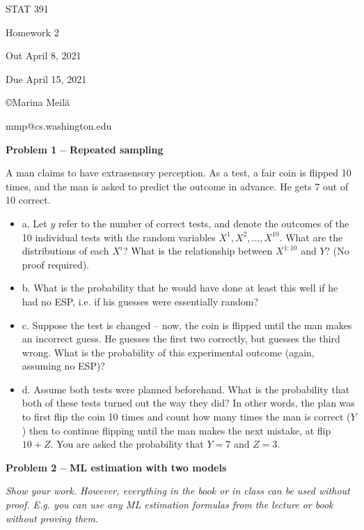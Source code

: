 \documentclass[10pt]{article}
\newcommand{\bit}{\begin{itemize}}
\newcommand{\eit}{\end{itemize}}
\begin{document}
\begin{Large}
\centerline{STAT 391} 
\centerline{Homework 2}  %
\centerline{Out April 8, 2021}      %
\centerline{Due April 15, 2021}      %
\end{Large}

\centerline{\large \copyright Marina Meil\u{a}}
\centerline{\large mmp@cs.washington.edu}

\vspace{2em}
{\bf Problem 1 -- Repeated sampling}
       
A man claims to have extrasensory perception. As a test, a fair coin
is flipped 10 times, and the man is asked to predict the outcome in
advance. He gets 7 out of 10 correct. 

\bit
\item[a.]  Let $y$ refer to the number of correct tests, and
   denote the outcomes of the 10 individual tests with the random
   variables $X^1,X^2,..., X^{10}$.  What are the distributions
   of each $X^i$?  What is the relationship
   between $X^{1:10}$ and $Y$?   (No proof required).

\item[b.] What is the probability that he would have done at least
   this well if he had no ESP, i.e. if his guesses were essentially
   random?  

\item[c.] Suppose the test is changed -- now, the coin is flipped until the
   man makes an incorrect guess.  He guesses the first two correctly,
   but guesses the third wrong.  What is the probability of this
   experimental outcome (again, assuming no ESP)?

\item[d.] Assume both tests were planned beforehand.  What is the
  probability that both of these tests turned out the way they did?
  In other words, the plan was to first flip the coin 10 times and
  count how many times the man is correct ($Y$) then to continue flipping
  until the man makes the next mistake, at flip
  $10+Z$. You are asked the probability that $Y=7$ and $Z=3$. 
\eit


{\bf Problem 2 -- ML estimation with two models}

{\em Show your work. However, everything in the book or in class can be used without proof. E.g. you can use any ML estimation formulas from the lecture or book without proving them.}
\end{document}

